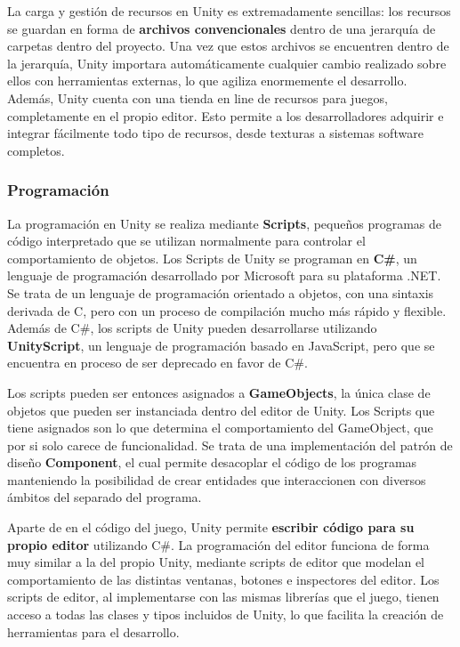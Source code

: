 La carga y gestión de recursos en Unity es extremadamente sencillas: los recursos se guardan en forma de \textbf{archivos convencionales} dentro de una jerarquía de carpetas dentro del proyecto. Una vez que estos archivos se encuentren dentro de la jerarquía, Unity importara automáticamente cualquier cambio realizado sobre ellos con herramientas externas, lo que agiliza enormemente el desarrollo. Además, Unity cuenta con una tienda en line de recursos para juegos, completamente en el propio editor. Esto permite a los desarrolladores adquirir e integrar fácilmente todo tipo de recursos, desde texturas a sistemas software completos. 

\subsubsection{Programación}
La programación en Unity se realiza mediante \textbf{Scripts}, pequeños programas de código interpretado que se utilizan normalmente para controlar el comportamiento de objetos. Los Scripts de Unity se programan en \textbf{C\#}, un lenguaje de programación desarrollado por Microsoft para su plataforma .NET. Se trata de un lenguaje de programación orientado a objetos, con una sintaxis derivada de C, pero con un proceso de compilación mucho más rápido y flexible. Además de C\#, los scripts de Unity pueden desarrollarse utilizando \textbf{UnityScript}, un lenguaje de programación basado en JavaScript, pero que se encuentra en proceso de ser deprecado en favor de C\#.

Los scripts pueden ser entonces asignados a \textbf{GameObjects}, la única clase de objetos que pueden ser instanciada dentro del editor de Unity. Los Scripts que tiene asignados son lo que determina el comportamiento del GameObject, que por si solo carece de funcionalidad. Se trata de una implementación del patrón de diseño \textbf{Component}, el cual permite desacoplar el código de los programas manteniendo la posibilidad de crear entidades que interaccionen con diversos ámbitos del separado del programa.

Aparte de en el código del juego, Unity permite\textbf{ escribir código para su propio editor} utilizando C\#. La programación del editor funciona de forma muy similar a la del propio Unity, mediante scripts de editor que modelan el comportamiento de las distintas ventanas, botones e inspectores del editor. Los scripts de editor, al implementarse con las mismas librerías que el juego, tienen acceso a todas las clases y tipos incluidos de Unity, lo que facilita la creación de herramientas para el desarrollo.


